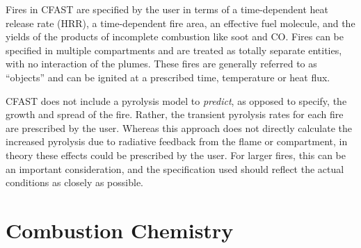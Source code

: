 \documentclass[12pt,twoside]{book}
\begin{document}
Fires in CFAST are specified by the user in terms of a time-dependent heat release rate (HRR), a time-dependent fire area, an effective fuel molecule, and the yields of the products of incomplete combustion like soot and CO. Fires can be specified in multiple compartments and are treated as totally separate entities, with no interaction of the plumes. These fires are generally referred to as ``objects'' and can be ignited at a prescribed time, temperature or heat flux.

CFAST does not include a pyrolysis model to \emph{predict}, as opposed to specify, the growth and spread of the fire. Rather, the transient pyrolysis rates for each fire are prescribed by the user. Whereas this approach does not directly calculate the increased pyrolysis due to radiative feedback from the flame or compartment, in theory these effects could be prescribed by the user. For larger fires, this can be an important consideration, and the specification used should reflect the actual conditions as closely as possible.

\section{Combustion Chemistry}
\end{document}
